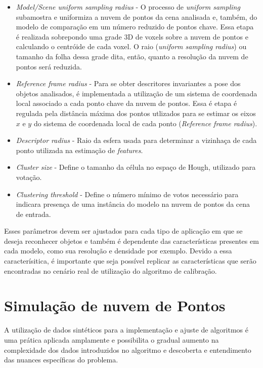 \begin{itemize}
  \item \textit{Model/Scene uniform sampling radius} - O processo de
  \textit{uniform sampling} subamostra e uniformiza a nuvem de pontos da cena
  analisada e, também, do modelo de comparação em um número reduzido de pontos
  chave.
  Essa etapa é realizada sobrepondo uma grade 3D de voxels sobre a nuvem de
  pontos e calculando o centróide de cada voxel.  O raio (\textit{uniform
  sampling radius}) ou tamanho da folha dessa grade dita, então, quanto a
  resolução da nuvem de pontos será reduzida.
  \item \textit{Reference frame radius} - Para se obter descritores invariantes
  a pose dos objetos analisados, é implementada a utilização de um sistema de
  coordenada local associado a cada ponto chave da nuvem de pontos. Essa é etapa
  é regulada pela distância máxima dos pontos utlizados para se estimar os
  eixos $x$ e $y$ do sistema de coordenada local de cada ponto
  (\textit{Reference frame radius}).
  \item \textit{Descriptor radius} - Raio da esfera usada para determinar a
  vizinhaça de cada ponto utilizada na estimação de \textit{features}.
  \item \textit{Cluster size} - Define o tamanho da célula no espaço de
  Hough, utilizado para votação. %
  \item \textit{Clustering threshold} - Define o número mínimo de votos
  necessário para indicara presença de uma instância do modelo na nuvem de
  pontos da cena de entrada. \end{itemize}

Esses parâmetros devem ser ajustados para cada tipo de aplicação em que se
deseja reconhecer objetos e também é dependente das características presentes em
cada modelo, como sua resolução e densidade por exemplo. Devido a essa
caracterísitica, é importante que seja possível replicar as características que
serão encontradas no cenário real de utilização do algoritmo de calibração. 

\section{Simulação de nuvem de Pontos}

A utilização de dados sintéticos para a implementação e ajuste de algoritmos é
uma prática aplicada amplamente e possibilita o gradual aumento na complexidade
dos dados introduzidos no algoritmo e descoberta e entendimento das nuances
específicas do problema.

